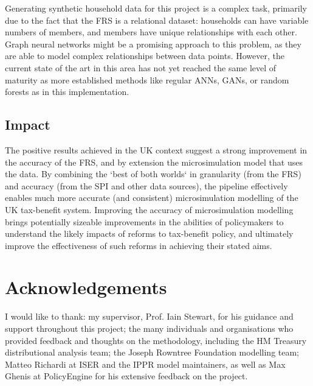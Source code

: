 \documentclass[twocolumn]{article}
\begin{document}
Generating synthetic household data for this project is a complex task, primarily due to the fact that the FRS is a relational dataset: households can have variable numbers of members, and members have unique relationships with each other. Graph neural networks might be a promising approach to this problem, as they are able to model complex relationships between data points. However, the current state of the art in this area has not yet reached the same level of maturity as more established methods like regular ANNs, GANs, or random forests as in this implementation.



\subsection{Impact}

The positive results achieved in the UK context suggest a strong improvement in the accuracy of the FRS, and by extension the microsimulation model that uses the data. By combining the `best of both worlds` in granularity (from the FRS) and accuracy (from the SPI and other data sources), the pipeline effectively enables much more accurate (and consistent) microsimulation modelling of the UK tax-benefit system. Improving the accuracy of microsimulation modelling brings potentially sizeable improvements in the abilities of policymakers to understand the likely impacts of reforms to tax-benefit policy, and ultimately improve the effectiveness of such reforms in achieving their stated aims.

\section*{Acknowledgements}

I would like to thank: my supervisor, Prof. Iain Stewart, for his guidance and support throughout this project; the many individuals and organisations who provided feedback and thoughts on the methodology, including the HM Treasury distributional analysis team; the Joseph Rowntree Foundation modelling team; Matteo Richardi at ISER and the IPPR model maintainers, as well as Max Ghenis at PolicyEngine for his extensive feedback on the project.

\end{document}

